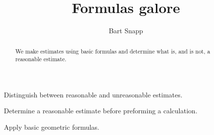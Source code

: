 \documentclass[handout,nooutcomes,noauthor,hints]{ximera}
\title{Formulas galore}
\author{Bart Snapp}
\begin{document}
\begin{abstract}
We make estimates using basic formulas and determine what is, and is
not, a reasonable estimate.
\end{abstract}
\maketitle

\begin{listOutcomes}
\item Distinguish between reasonable and unreasonable estimates.
\item Determine a reasonable estimate before preforming a calculation.
\item Apply basic geometric formulas.
\end{listOutcomes}
\end{document}
